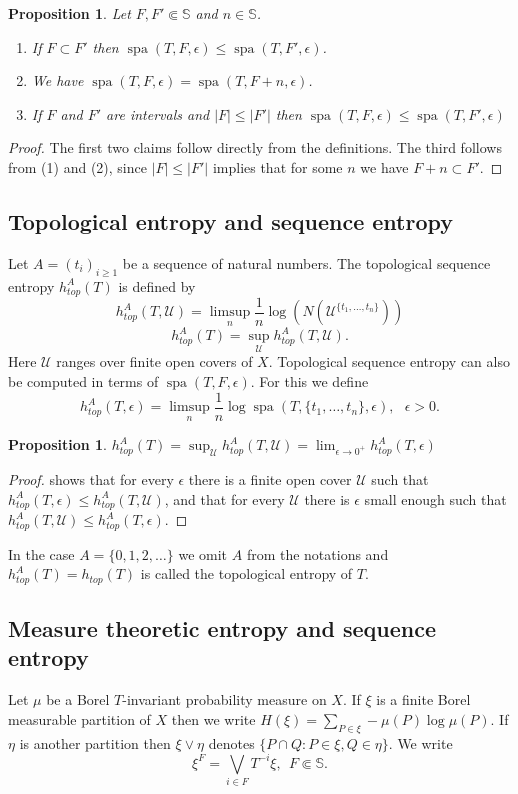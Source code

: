 \documentclass[a4paper,oneside]{amsart}
\renewcommand{\(}{\begin{dmath*}}
\renewcommand{\)}{\end{dmath*}}
\newtheorem{proposition}[theorem]{Proposition}
\theoremstyle{definition}
\newcommand{\SE}{\mathbb{S}}
\newcommand{\U}{\mathcal{U}}
\newcommand{\spa}{\operatorname{spa}}
\begin{document}
\begin{proposition}\label{monotony-properties-of-spa}Let $F,F'\Subset\SE$ and $n\in\SE$. 
    \begin{enumerate}
        \item If $F\subset F'$ then $\spa(T,F,\epsilon)\leq\spa(T,F',\epsilon)$. 
        \item We have $\spa(T,F,\epsilon)=\spa(T,F+n,\epsilon)$. 
        \item If $F$ and $F'$ are intervals and $|F|\leq |F'|$ then $\spa(T,F,\epsilon)\leq \spa(T,F',\epsilon)$
    \end{enumerate}
    \end{proposition}
\begin{proof}
    The first two claims follow directly from the definitions. The third follows from (1) and (2), since $|F|\leq |F'|$ implies that for some $n$ we have $F+n\subset F'$.
\end{proof}
\subsection{Topological entropy and sequence entropy} Let $A=(t_i)_{i\geq 1}$ be a sequence of natural numbers. The topological sequence entropy $h^A_{top}(T)$ is defined by 
\[ h^{A}_{top}(T,\U)=\limsup_n \frac{1}{n}\log(N( \U^{\{t_1,\dots,t_n\}})) \]
\[
h^A_{top}(T)=\sup_{\U}h^A_{top}(T,\U).\]
Here $\U$ ranges over finite open covers of $X$. Topological sequence entropy can also be computed in terms of $\spa(T,F,\epsilon)$. For this we define 
\begin{equation}\label{definition-h-T-epsilon}h^A_{top}(T,\epsilon)=\limsup_{n} \frac{1}{n}\log \spa(T,\{t_1,\dots,t_n\},\epsilon), \ \ \ \epsilon>0.\end{equation}
\begin{proposition}\label{sequence-entropy-spanning-sets}
    $h^A_{top}(T)=\sup_{\U}h^A_{top}(T,\U)=\lim_{\epsilon\to 0^+} h^A_{top}(T,\epsilon)$
\end{proposition}
\begin{proof}
 shows that for every $\epsilon$ there is a finite open cover $\U$ such that $h^A_{top}(T,\epsilon)\leq h^A_{top}(T,\U)$, and that for every $\U$ there is $\epsilon$ small enough such that $h^A_{top}(T,\U)\leq h^A_{top}(T,\epsilon)$.
\end{proof}
In the case $A=\{0,1,2,\dots\}$ we omit $A$ from the notations and $h^A_{top}(T)=h_{top}(T)$ is called the topological entropy of $T$. 
\subsection{Measure theoretic entropy and sequence entropy}
Let $\mu$ be a Borel $T$-invariant probability measure on $X$. If $\xi$ is a finite Borel measurable partition of $X$ then we write $H(\xi)=\sum_{P\in \xi}-\mu(P)\log \mu(P)$. If $\eta$ is another partition then $\xi\vee \eta $ denotes $\{P\cap Q : P\in \xi, Q\in \eta\}$. We write
\[\xi^F = \bigvee_{i\in F}T^{-i}\xi, \ \ F\Subset \SE.\] 
\end{document}
